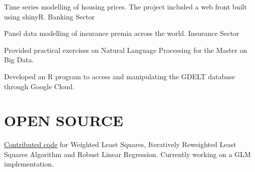 \documentclass[]{deedy-resume-openfont}
\begin{document}
\begin{minipage}[t]{0.66\textwidth}
\begin{tightemize}
\item Time series modelling of housing prices. The project included a web front built using shinyR. Banking Sector
\item Panel data modelling of insurance premia across the world. Insurance Sector
\end{tightemize}
\sectionsep

Provided practical exercises on Natural Language Processing for 
the Master on Big Data.
\sectionsep

\begin{tightemize}
\item Developed an R program to access and manipulating the GDELT database through Google Cloud.
\end{tightemize} 



\section{OPEN SOURCE}
\location{}
\href{https://github.com/incanter/incanter/pull/396/files}{Contributed code} for Weighted Least Squares,
Iteratively Reweighted Least Squares Algorithm and Robust Linear Regression. Currently working on a GLM implementation.
\sectionsep

\end{minipage} 
\end{document}
